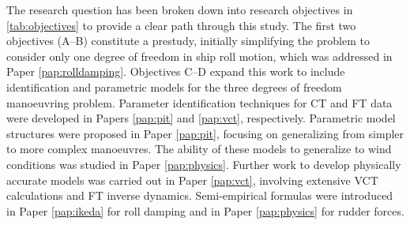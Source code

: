 \noindent The research question has been broken down into research objectives in \autoref{tab:objectives} to provide a clear path through this study. The first two objectives (A--B) constitute a prestudy, initially simplifying the problem to consider only one degree of freedom in ship roll motion, which was addressed in Paper \ref{pap:rolldamping}. Objectives C--D expand this work to include identification and parametric models for the three degrees of freedom manoeuvring problem. Parameter identification techniques for CT and FT data were developed in Papers \ref{pap:pit} and \ref{pap:vct}, respectively. Parametric model structures were proposed in Paper \ref{pap:pit}, focusing on generalizing from simpler to more complex manoeuvres. The ability of these models to generalize to wind conditions was studied in Paper \ref{pap:physics}. Further work to develop physically accurate models was carried out in Paper \ref{pap:vct}, involving extensive VCT calculations and FT inverse dynamics. Semi-empirical formulas were introduced in Paper \ref{pap:ikeda} for roll damping and in Paper \ref{pap:physics} for rudder forces. 
%
%
%    
%    
%
%
%    
